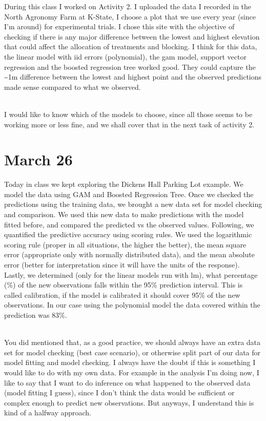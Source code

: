 \documentclass[
]{book}
\begin{document}
During this class I worked on Activity 2. I uploaded the data I recorded in the North Agronomy Farm at K-State, I choose a plot that we use every year (since I'm around) for experimental trials. I chose this site with the objective of checking if there is any major difference between the lowest and highest elevation that could affect the allocation of treatments and blocking. I think for this data, the linear model with iid errors (polynomial), the gam model, support vector regression and the boosted regression tree worked good. They could capture the \textasciitilde1m difference between the lowest and highest point and the observed predictions made sense compared to what we observed.\\
\strut \\
I would like to know which of the models to choose, since all those seems to be working more or less fine, and we shall cover that in the next task of activity 2.

\hypertarget{march-26}{%
\section{March 26}\label{march-26}}

Today in class we kept exploring the Dickens Hall Parking Lot example. We model the data using GAM and Boosted Regression Tree. Once we checked the predictions using the training data, we brought a new data set for model checking and comparison. We used this new data to make predictions with the model fitted before, and compared the predicted vs the observed values. Following, we quantified the predictive accuracy using scoring rules. We used the logarithmic scoring rule (proper in all situations, the higher the better), the mean square error (appropriate only with normally distributed data), and the mean absolute error (better for interpretation since it will have the units of the response). Lastly, we determined (only for the linear models run with lm), what percentage (\%) of the new observations falls within the 95\% prediction interval. This is called calibration, if the model is calibrated it should cover 95\% of the new observations. In our case using the polynomial model the data covered within the prediction was 83\%.\\
\strut \\
You did mentioned that, as a good practice, we should always have an extra data set for model checking (best case scenario), or otherwise split part of our data for model fitting and model checking. I always have the doubt if this is something I would like to do with my own data. For example in the analysis I'm doing now, I like to say that I want to do inference on what happened to the observed data (model fitting I guess), since I don't think the data would be sufficient or complex enough to predict new observations. But anyways, I understand this is kind of a halfway approach.
\end{document}
